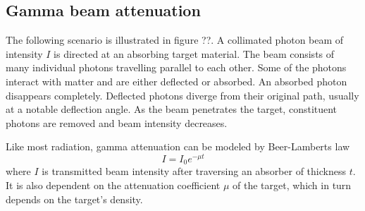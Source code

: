 \subsection{Gamma beam attenuation}
The following scenario is illustrated in figure ??. A collimated photon beam of intensity $I$ is directed at an absorbing target material. The beam consists of many individual photons travelling parallel to each other. Some of the photons interact with matter and are either deflected or absorbed. An absorbed photon disappears completely. Deflected photons diverge from their original path, usually at a notable deflection angle. As the beam penetrates the target, constituent photons are removed and beam intensity decreases.

Like most radiation, gamma attenuation can be modeled by Beer-Lamberts law
    \begin{equation}
    I=I_0 e^{-μt}
    \end{equation}
where $I$ is transmitted beam intensity after traversing an absorber of thickness $t$. It is also dependent on the attenuation coefficient $\mu$ of the target, which in turn depends on the target’s density. 
